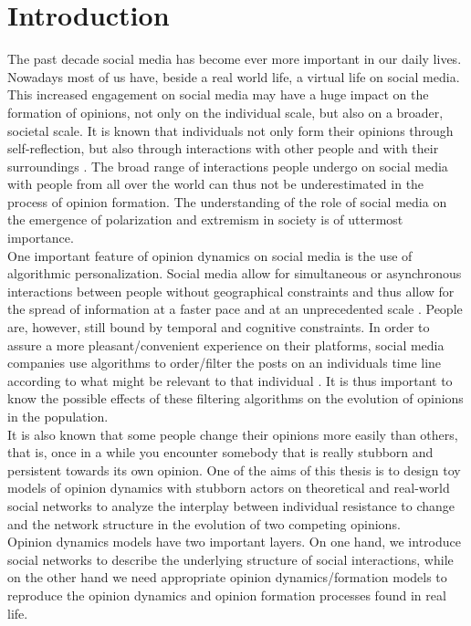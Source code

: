 \documentclass[11 pt , letterpaper , twoside , openright]{book}
\begin{document}
\frontmatter
\tableofcontents

\mainmatter
\chapter{Introduction}


The past decade social media has become ever more important in our daily lives. Nowadays most of us have, beside a real world life, a virtual life on social media. This increased engagement on social media may have a huge impact on the formation of opinions, not only on the individual scale, but also on a broader, societal scale. It is known that individuals not only form their opinions through self-reflection, but also through interactions with other people and with their surroundings \cite{Perra2019}. The broad range of interactions people undergo on social media with people from all over the world can thus not be underestimated in the process of opinion formation. The understanding of the role of social media on the emergence of polarization and extremism in society is of uttermost importance.\\
\newline
One important feature of opinion dynamics on social media is the use of algorithmic personalization. Social media allow for simultaneous or asynchronous interactions between people without geographical constraints and thus allow for the spread of information at a faster pace and at an unprecedented scale \cite{Perra2019}. People are, however, still bound by temporal and cognitive constraints. In order to assure a more pleasant/convenient experience on their platforms, social media companies use algorithms to order/filter the posts on an individuals time line according to what might be relevant to that individual \cite{Perra2019}. It is thus important to know the possible effects of these filtering algorithms on the evolution of opinions in the population.\\  
\newline
It is also known that some people change their opinions more easily than others, that is, once in a while you encounter somebody that is really stubborn and persistent towards its own opinion. One of the aims of this thesis is to design toy models of opinion dynamics with stubborn actors on theoretical and real-world social networks to analyze the interplay between individual resistance to change and the network structure in the evolution of two competing opinions.\\
\newline
Opinion dynamics models have two important layers. On one hand, we introduce social networks to describe the underlying structure of social interactions, while on the other hand we need appropriate opinion dynamics/formation models to reproduce the opinion dynamics and opinion formation processes found in real life.
\end{document}
